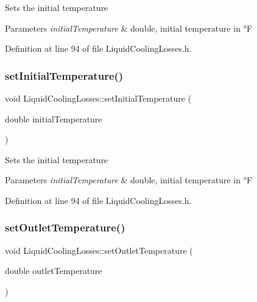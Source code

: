 Sets the initial temperature 
\begin{DoxyParams}{Parameters}
{\em initial\+Temperature} & double, initial temperature in °F \\
\hline
\end{DoxyParams}


Definition at line 94 of file Liquid\+Cooling\+Losses.\+h.

\mbox{\label{class_liquid_cooling_losses_aa7f7718de77a96b8e269a06a24d297d8}} 
\subsubsection{\texorpdfstring{set\+Initial\+Temperature()}{setInitialTemperature()}\hspace{0.1cm}{\footnotesize\ttfamily [3/3]}}
{\footnotesize\ttfamily void Liquid\+Cooling\+Losses\+::set\+Initial\+Temperature (\begin{DoxyParamCaption}\item[{double}]{initial\+Temperature }\end{DoxyParamCaption})\hspace{0.3cm}{\ttfamily [inline]}}

Sets the initial temperature 
\begin{DoxyParams}{Parameters}
{\em initial\+Temperature} & double, initial temperature in °F \\
\hline
\end{DoxyParams}


Definition at line 94 of file Liquid\+Cooling\+Losses.\+h.

\mbox{\label{class_liquid_cooling_losses_ab8ea8e748853e18fa480afa0b3e417ee}} 
\subsubsection{\texorpdfstring{set\+Outlet\+Temperature()}{setOutletTemperature()}\hspace{0.1cm}{\footnotesize\ttfamily [1/3]}}
{\footnotesize\ttfamily void Liquid\+Cooling\+Losses\+::set\+Outlet\+Temperature (\begin{DoxyParamCaption}\item[{double}]{outlet\+Temperature }\end{DoxyParamCaption})\hspace{0.3cm}{\ttfamily [inline]}}

